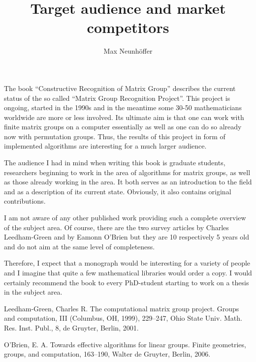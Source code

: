 \documentclass[11pt]{article}
\begin{document}
\title{Target audience and market competitors}
\author{Max Neunh\"offer}
\maketitle

The book ``Constructive Recognition of Matrix Group'' describes the
current status of the so called ``Matrix Group Recognition Project''.
This project is ongoing, started in the 1990s and in the meantime
some 30-50 mathematicians worldwide are more or less involved.
Its ultimate aim is that one can work with finite matrix groups
on a computer essentially as well as one can do so already now with
permutation groups. Thus, the results of this project in form of
implemented algorithms are interesting for a much larger audience.

The audience I had in mind when writing this book is graduate
students, researchers beginning to work in the area of
algorithms for matrix groups, as well as those already working
in the area. It both serves as an introduction to the field and
as a description of its current state. Obviously, it also contains
original contributions.

I am not aware of any other published work providing such a complete
overview of the subject area. Of course, there are the two survey
articles \cite{CLG} by Charles Leedham-Green and \cite{EOB} 
by Eamonn O'Brien but they
are 10 respectively 5 years old and do not aim at the same level of
completeness.

Therefore, I expect that a monograph would be interesting for a
variety of people and I imagine that quite a few mathematical
libraries would order a copy. I would certainly recommend the book
to every PhD-student starting to work on a thesis in the subject area.

\begin{thebibliography}{[1]}
 Leedham-Green, Charles R.  \newblock
 The computational matrix group project. \newblock
 Groups and computation, III (Columbus, OH, 1999), 
 229--247, Ohio State Univ. Math. Res. Inst. Publ., 8, de Gruyter,
Berlin,  2001. 
                
 O'Brien, E. A. \newblock
 Towards effective algorithms for linear groups. \newblock
 Finite geometries, groups, and computation, 
 163--190, Walter de Gruyter, Berlin,  2006. 

\end{thebibliography}
\end{document}
